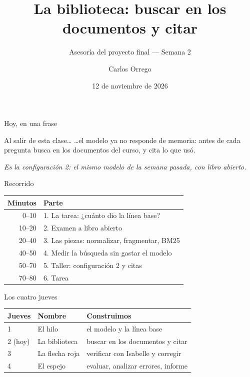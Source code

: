 \documentclass[10pt]{beamer}
\title[Semana 2: La biblioteca]{La biblioteca: buscar en los documentos y citar}
\subtitle{Asesoría del proyecto final --- Semana 2}
\author{Carlos Orrego}
\institute[UNAL]{Razonamiento Automático --- Prof.\ Fabián Serrano \\ Universidad Nacional de Colombia --- Sede Manizales}
\date{12 de noviembre de 2026}
\newcommand{\nota}[1]{{\small\itshape\color{psCom} #1}}
\begin{document}
\maketitle

\begin{frame}{Hoy, en una frase}
  \vspace{1em}
  \begin{block}{Al salir de esta clase\ldots}
    \large
    \ldots el modelo ya no responde de memoria: antes de cada pregunta
    busca en los documentos del curso, y cita lo que usó.
  \end{block}
  \vspace{0.5em}
  \nota{Es la configuración 2: el mismo modelo de la semana pasada, con
  libro abierto.}
\end{frame}

\begin{frame}{Recorrido}
  \begin{center}
  \begin{tabular}{@{}rl@{}}
    \toprule
    Minutos & Parte \\
    \midrule
    0--10  & 1. La tarea: ¿cuánto dio la línea base? \\
    10--20 & 2. Examen a libro abierto \\
    20--40 & 3. Las piezas: normalizar, fragmentar, BM25 \\
    40--50 & 4. Medir la búsqueda sin gastar el modelo \\
    50--70 & 5. Taller: configuración 2 y citas \\
    70--80 & 6. Tarea \\
    \bottomrule
  \end{tabular}
  \end{center}
\end{frame}

\begin{frame}{Los cuatro jueves}
  \begin{center}
  \begin{tabular}{@{}lll@{}}
    \toprule
    Jueves & Nombre & Construimos \\
    \midrule
    1 & El hilo & el modelo y la línea base \\
    \alert{2 (hoy)} & \alert{La biblioteca} & \alert{buscar en los documentos y citar} \\
    3 & La flecha roja & verificar con Isabelle y corregir \\
    4 & El espejo & evaluar, analizar errores, informe \\
    \bottomrule
  \end{tabular}
  \end{center}
\end{frame}
\end{document}
